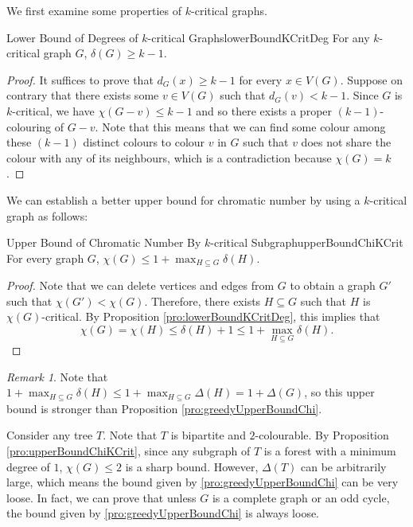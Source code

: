 \documentclass[math]{amznotes}
\theoremstyle{remark}
\newtheorem*{remark}{Remark}
\newcommand{\0}{\mathbf{0}}
\newcommand{\1}{\mathbf{1}}
\begin{document}
We first examine some properties of $k$-critical graphs.
\begin{probox}{Lower Bound of Degrees of $k$-critical Graphs}{lowerBoundKCritDeg}
    For any $k$-critical graph $G$, $\delta(G) \geq k - 1$.
    \tcblower
    \begin{proof}
        It suffices to prove that $d_G(x) \geq k - 1$ for every $x \in V(G)$. Suppose on contrary that there exists some $v \in V(G)$ such that $d_G(v) < k - 1$. Since $G$ is $k$-critical, we have $\chi(G - v) \leq k - 1$ and so there exists a proper $(k - 1)$-colouring of $G - v$. Note that this means that we can find some colour among these $(k - 1)$ distinct colours to colour $v$ in $G$ such that $v$ does not share the colour with any of its neighbours, which is a contradiction because $\chi(G) = k$.
    \end{proof}
\end{probox}
We can establish a better upper bound for chromatic number by using a $k$-critical graph as follows:
\begin{probox}{Upper Bound of Chromatic Number By $k$-critical Subgraph}{upperBoundChiKCrit}
    For every graph $G$, $\chi(G) \leq 1 + \max_{H \subseteq G}\delta(H)$.
    \tcblower
    \begin{proof}
        Note that we can delete vertices and edges from $G$ to obtain a graph $G'$ such that $\chi(G') < \chi(G)$. Therefore, there exists $H \subseteq G$ such that $H$ is $\chi(G)$-critical. By Proposition \ref{pro:lowerBoundKCritDeg}, this implies that
        \begin{equation*}
            \chi(G) = \chi(H) \leq \delta(H) + 1 \leq 1 + \max_{H \subseteq G}\delta(H).
        \end{equation*}
    \end{proof}
\end{probox}
\begin{notebox}
    \begin{remark}
        Note that $1 + \max_{H \subseteq G}\delta(H) \leq 1 + \max_{H \subseteq G}\Delta(H) = 1 + \Delta(G)$, so this upper bound is stronger than Proposition \ref{pro:greedyUpperBoundChi}.
    \end{remark}
\end{notebox}
Consider any tree $T$. Note that $T$ is bipartite and $2$-colourable. By Proposition \ref{pro:upperBoundChiKCrit}, since any subgraph of $T$ is a forest with a minimum degree of $1$, $\chi(G) \leq 2$ is a sharp bound. However, $\Delta(T)$ can be arbitrarily large, which means the bound given by \ref{pro:greedyUpperBoundChi} can be very loose. In fact, we can prove that unless $G$ is a complete graph or an odd cycle, the bound given by \ref{pro:greedyUpperBoundChi} is always loose.
\end{document}
